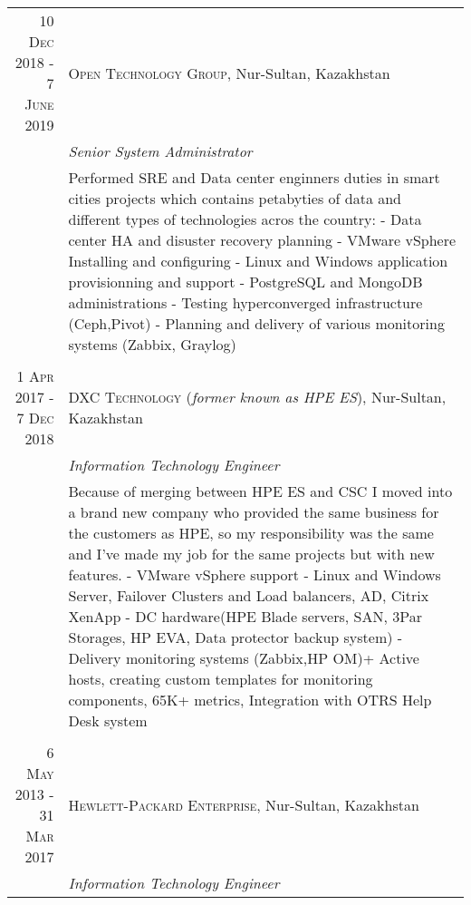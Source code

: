 \documentclass[a4paper,10pt]{article}
\begin{document}
\begin{longtable}{r|p{11cm}}
\textsc{10 Dec 2018 - 7 June 2019} & \textsc{Open Technology Group}, Nur-Sultan, Kazakhstan \\
                                   & \emph{Senior System Administrator}\\
& \footnotesize{\textnormal{Performed SRE and Data center enginners duties in smart cities projects which contains petabyties 
of data and different types of technologies acros the country:\newline
- Data center HA and disuster recovery planning
- VMware vSphere Installing and configuring\newline
- Linux and Windows application provisionning and support\newline
- PostgreSQL and MongoDB administrations\newline
- Testing hyperconverged infrastructure (Ceph,Pivot)\newline
- Planning and delivery of various monitoring systems (Zabbix, Graylog)}}\\
\multicolumn{2}{c}{} \\
\textsc{1 Apr 2017 - 7 Dec 2018} & \textsc{DXC Technology} (\emph{former known as HPE ES}), Nur-Sultan, Kazakhstan \\
                                 & \emph{Information Technology Engineer}\\
& \footnotesize{\textnormal{Because of merging between HPE ES and CSC I moved into a brand new company who provided the same business for the 
customers as HPE, so my responsibility was the same and I've made my job for the same projects but with new features.\newline
- VMware vSphere support\newline
- Linux and Windows Server, Failover Clusters and Load balancers, AD, Citrix XenApp\newline
- DC hardware(HPE Blade servers, SAN, 3Par Storages, HP EVA, Data protector backup system)\newline
- Delivery monitoring systems (Zabbix,HP OM)\newline
70+ Active hosts, creating custom templates for monitoring components, 65K+ metrics, Integration with OTRS Help Desk system}}\\
\multicolumn{2}{c}{} \\
\textsc{6 May 2013 - 31 Mar 2017} & \textsc{Hewlett-Packard Enterprise}, Nur-Sultan, Kazakhstan \\
                                  & \emph{Information Technology Engineer}\\

\end{longtable}
\end{document}
